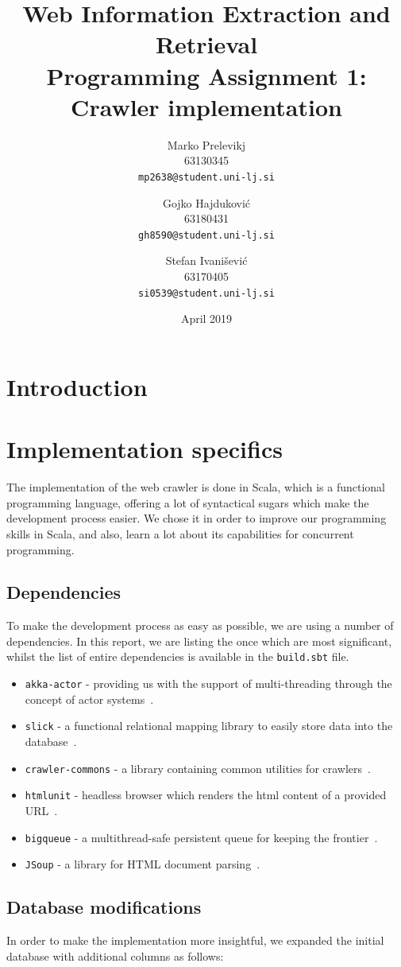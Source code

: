 \documentclass{article}
\title{
	Web Information Extraction and Retrieval\\
	Programming Assignment 1: \\
	Crawler implementation
}
\author{
  Marko Prelevikj\\
  63130345\\
  \texttt{mp2638@student.uni-lj.si}
  \and
  Gojko Hajduković\\
  63180431\\
  \texttt{gh8590@student.uni-lj.si}
  \and
  Stefan Ivanišević\\
  63170405\\
  \texttt{si0539@student.uni-lj.si}
}
\date{April 2019}
\begin{document}
\maketitle

\section{Introduction}

\section{Implementation specifics}
The implementation of the web crawler is done in Scala, which is a functional programming language, offering a lot of syntactical sugars which make the development process easier.
We chose it in order to improve our programming skills in Scala, and also, learn a lot about its capabilities for concurrent programming.

\subsection{Dependencies}
To make the development process as easy as possible, we are using a number of dependencies. In this report, we are listing the once which are most significant, whilst the list of entire dependencies is available in the \texttt{build.sbt} file. 
\begin{itemize}
	\item \texttt{akka-actor} - providing us with the support of multi-threading through the concept of actor systems~\cite{Akka:ActorSystem}.
	\item \texttt{slick} - a functional relational mapping library to easily store data into the database~\cite{Slick}.
	\item \texttt{crawler-commons} - a library containing common utilities for crawlers~\cite{Crawler-commons}.
	\item \texttt{htmlunit} - headless browser which renders the html content of a provided URL~\cite{htmlunit}.
	\item \texttt{bigqueue} - a multithread-safe persistent queue for keeping the frontier~\cite{bigqueue}.
	\item \texttt{JSoup} - a library for HTML document parsing~\cite{jsoup}.
\end{itemize}

\subsection{Database modifications}
In order to make the implementation more insightful, we expanded the initial database with additional columns as follows:
\end{document}
